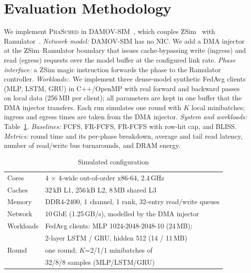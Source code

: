 \documentclass[conference]{IEEEtran}
\newcommand{\name}{\textsc{PhaSched}}
\begin{document}
\section{Evaluation Methodology}
We implement \name{} in DAMOV-SIM~\cite{damov}, which couples ZSim~\cite{zsim} with Ramulator~\cite{ramulator}. \emph{Network model:} DAMOV-SIM has no NIC. We add a DMA injector at the ZSim--Ramulator boundary that issues cache-bypassing write (ingress) and read (egress) requests over the model buffer at the configured link rate. \emph{Phase interface:} a ZSim magic instruction forwards the phase to the Ramulator controller.  \emph{Workloads:}. We implement three dense-model synthetic FedAvg clients (MLP, LSTM, GRU) in C++/OpenMP with real forward and backward passes on local data (256\,MB per client); all parameters are kept in one buffer that the DMA injector transfers. Each run simulates one round with $K$ local minibatches; ingress and egress times are taken from the DMA injector.
\emph{System and workloads:} Table~\ref{tab:config}. \emph{Baselines:} FCFS, FR-FCFS, FR-FCFS with row-hit cap, and BLISS. \emph{Metrics:} round time and its per-phase breakdown, average and tail read latency, number of read/write bus turnarounds, and DRAM energy.

\begin{table}[t]
\centering
\caption{Simulated configuration}
\label{tab:config}
\footnotesize
\begin{tabular}{@{}ll@{}}
\toprule
Cores & 4 $\times$ 4-wide out-of-order x86-64, 2.4\,GHz \\
Caches & 32\,kB L1, 256\,kB L2, 8\,MB shared L3 \\
Memory & DDR4-2400, 1 channel, 1 rank, 32-entry read/write queues \\
Network & 10\,GbE (1.25\,GB/s), modelled by the DMA injector \\
Workloads & FedAvg clients: MLP 1024-2048-2048-10 (24\,MB); \\
 & 2-layer LSTM / GRU, hidden 512 (14 / 11\,MB) \\
Round & one round; $K$=2/1/1 minibatches of \\
 & 32/8/8 samples (MLP/LSTM/GRU) \\
\bottomrule
\end{tabular}
\end{table}
\end{document}

